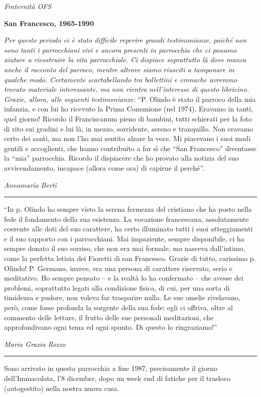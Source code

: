 \begin{flushright}
\textit{Fraternità OFS}
\end{flushright}
\bigskip
{}
{}
\begin{center}
\textbf{\Large San Francesco, 1965-1990}
\end{center}
\bigbreak
\textit{Per questo periodo ci è stato difficile reperire grandi testimonianze, poiché non sono tanti i
parrocchiani vivi e ancora presenti in parrocchia che ci possono aiutare a ricostruire la vita 
parrocchiale. Ci dispiace soprattutto là dove manca anche il racconto del parroco, mentre altrove siamo riusciti a tamponare in qualche modo. Certamente 
scartabellando tra bollettini e cronache avremmo trovato materiale interessante, ma non rientra 
nell’interesse di questo libricino. Grazie, allora, alle seguenti testimonianze:}
\medbreak
``P. Olindo è stato il parroco della mia infanzia, e con lui ho ricevuto la Prima Comunione 
(nel 1974). Eravamo in tanti, quel giorno! Ricordo il Franciscanum pieno di bambini, tutti schierati 
per la foto di rito sui gradini e lui là, in mezzo, sorridente, sereno e tranquillo.
Non eravamo certo dei santi, ma non l’ho mai sentito alzare la voce.
Mi piacevano i suoi modi gentili e accoglienti, che hanno contribuito a far sì che “San Francesco” 
diventasse la “mia” parrocchia.
Ricordo il dispiacere che ho provato alla notizia del suo avvicendamento, incapace (allora come 
ora) di capirne il perché''.\par
\hfill\textit{Annamaria Berti}
\begin{center}
	\noindent\rule{0.5\textwidth}{0.4pt}
\end{center}
“In p. Olindo ho sempre visto la serena fermezza del cristiano che ha posto nella fede il 
fondamento della sua esistenza. La vocazione francescana, assolutamente coerente alle doti del suo 
carattere, ha certo illuminato tutti i suoi atteggiamenti e il suo rapporto con i parrocchiani. Mai 
impaziente, sempre disponibile, ci ha sempre donato il suo sorriso, che non era mai formale, ma 
nasceva dall’intimo, come la perfetta letizia dei Fioretti di san Francesco.
Grazie di tutto, carissimo p. Olindo! 
\medbreak
P. Germano, invece, era una persona di carattere riservato, serio e meditativo. Ho sempre 
pensato – e la realtà lo ha confermato – che avesse dei problemi, soprattutto legati alla condizione 
fisica, di cui, per una sorta di timidezza e pudore, non voleva far trasparire nulla.
Le sue omelie rivelavano, però, come fosse profonda la sorgente della sua fede: egli ci offriva, oltre al commento 
delle letture, il frutto delle sue personali meditazioni, che approfondivano ogni tema ed ogni spunto.
Di questo lo ringraziamo!”\par
\hfill\textit{Maria Grazia Rozzo}
\begin{center}
	\noindent\rule{0.5\textwidth}{0.4pt}
\end{center}
Sono arrivato in questa parrocchia a fine 1987, precisamente il giorno dell’Immacolata, l’8 
dicembre, dopo un week end di fatiche per il trasloco (autogestito) nella nostra nuova casa.

